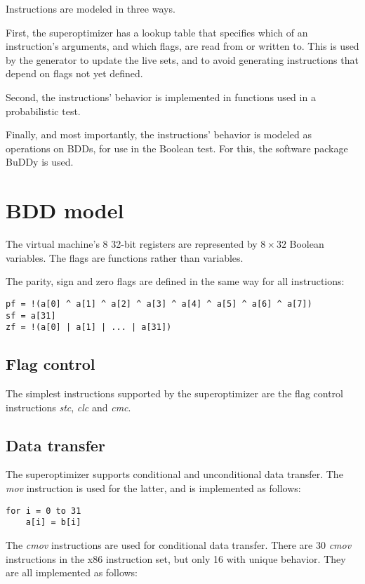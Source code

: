 \documentclass[a4paper,11pt]{kth-mag}
\begin{document}
Instructions are modeled in three ways.

First, the superoptimizer has a lookup table that specifies which of an instruction's arguments, and which flags, are read from or written to.
This is used by the generator to update the live sets, and to avoid generating instructions that depend on flags not yet defined.

Second, the instructions' behavior is implemented in functions used in a probabilistic test.

Finally, and most importantly, the instructions' behavior is modeled as operations on BDDs, for use in the Boolean test.
For this, the software package BuDDy \cite{buddy} is used.

\section{BDD model}

The virtual machine's 8 32-bit registers are represented by $8 \times 32$ Boolean variables. %
The flags are functions rather than variables.

The parity, sign and zero flags are defined in the same way for all instructions:

\begin{verbatim}
pf = !(a[0] ^ a[1] ^ a[2] ^ a[3] ^ a[4] ^ a[5] ^ a[6] ^ a[7])
sf = a[31]
zf = !(a[0] | a[1] | ... | a[31])
\end{verbatim}

\subsection{Flag control}

The simplest instructions supported by the superoptimizer are the flag control instructions \emph{stc}, \emph{clc} and \emph{cmc}.

\subsection{Data transfer}

The superoptimizer supports conditional and unconditional data transfer.
The \emph{mov} instruction is used for the latter, and is implemented as follows:

\begin{verbatim}
for i = 0 to 31
    a[i] = b[i]
\end{verbatim}

The \emph{cmov} instructions are used for conditional data transfer.
There are 30 \emph{cmov} instructions in the x86 instruction set, but only 16 with unique behavior.
They are all implemented as follows:
\end{document}

